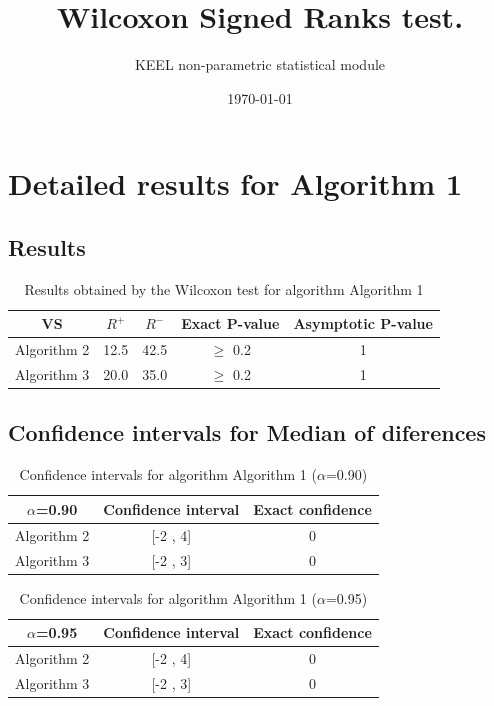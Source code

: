 \documentclass[a4paper,10pt]{article}
\title{Wilcoxon Signed Ranks test.}
\date{\today}
\author{KEEL non-parametric statistical module}
\begin{document}
\pagestyle{empty}
\maketitle
\thispagestyle{empty}



\section{Detailed results for Algorithm 1}


\subsection{Results}

\begin{table}[!htp]
\centering\small
\begin{tabular}{
|c|c|c|c|c|}
\hline
 VS & $R^{+}$ & $R^{-}$ & Exact P-value & Asymptotic P-value \\ \hline 
Algorithm 2 & 12.5 & 42.5 & $\geq$ 0.2 & 1\\ \hline 
Algorithm 3 & 20.0 & 35.0 & $\geq$ 0.2 & 1\\ \hline 

\end{tabular}
\caption{Results obtained by the Wilcoxon test for algorithm Algorithm 1}
\end{table}

\subsection{Confidence intervals for Median of diferences}

\begin{table}[!htp]
\centering\small
\begin{tabular}{
|c|c|c|}
\hline
 $\alpha$=0.90 & Confidence interval & Exact confidence \\ \hline 
Algorithm 2 & [-2 , 4] & 0\\ \hline 
Algorithm 3 & [-2 , 3] & 0\\ \hline 

\end{tabular}
\caption{Confidence intervals for algorithm Algorithm 1 ($\alpha$=0.90)}
\end{table}
\begin{table}[!htp]
\centering\small
\begin{tabular}{
|c|c|c|}
\hline
 $\alpha$=0.95 & Confidence interval & Exact confidence \\ \hline 
Algorithm 2 & [-2 , 4] & 0\\ \hline 
Algorithm 3 & [-2 , 3] & 0\\ \hline 

\end{tabular}
\caption{Confidence intervals for algorithm Algorithm 1 ($\alpha$=0.95)}
\end{table}
\end{document}
